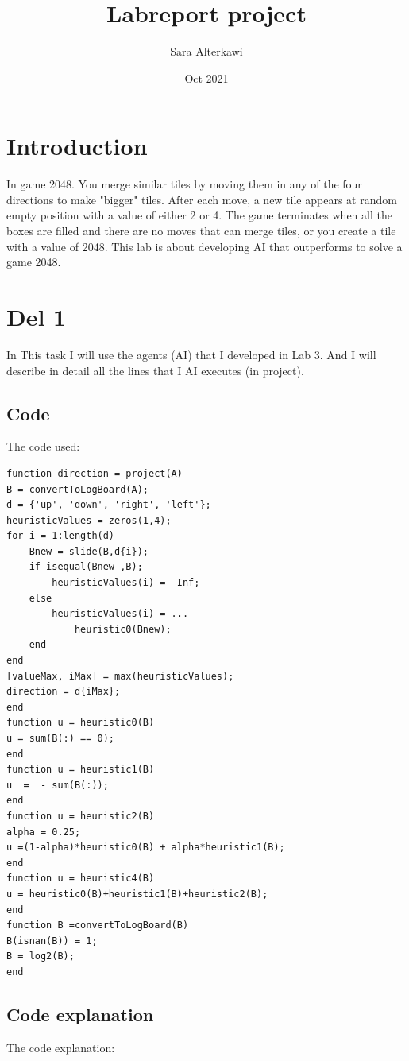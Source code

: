 \documentclass{article}
\title{Labreport project}
\author{Sara Alterkawi}
\affil{Dataingenjör, Group 1}
\date{Oct 2021}
\begin{document}
\maketitle

\section{Introduction}
In game 2048. You merge similar tiles by moving them in any of the four directions to make "bigger" tiles. After each move, a new tile appears at random empty position with a value of either 2 or 4. The game terminates when all the boxes are filled and there are no moves that can merge tiles, or you create a tile with a value of 2048.
This lab is about developing AI that outperforms to solve a game 2048.

\section{Del 1}
In This task I will use the agents (AI) that I developed in Lab 3. And I will describe in detail all the lines that I AI executes (in project).

\subsection{Code}
The code used:

\begin{tcolorbox}
\begin{verbatim}
function direction = project(A)
B = convertToLogBoard(A);
d = {'up', 'down', 'right', 'left'};
heuristicValues = zeros(1,4);
for i = 1:length(d)
    Bnew = slide(B,d{i});
    if isequal(Bnew ,B);
        heuristicValues(i) = -Inf;
    else
        heuristicValues(i) = ... 
            heuristic0(Bnew);
    end
end
[valueMax, iMax] = max(heuristicValues);
direction = d{iMax};
end
function u = heuristic0(B)
u = sum(B(:) == 0);
end
function u = heuristic1(B)
u  =  - sum(B(:)); 
end
function u = heuristic2(B)
alpha = 0.25; 
u =(1-alpha)*heuristic0(B) + alpha*heuristic1(B);
end
function u = heuristic4(B)
u = heuristic0(B)+heuristic1(B)+heuristic2(B);
end
function B =convertToLogBoard(B)
B(isnan(B)) = 1;
B = log2(B);
end
\end{verbatim}
\end{tcolorbox}

\subsection{Code explanation}
The code explanation:
\end{document}
